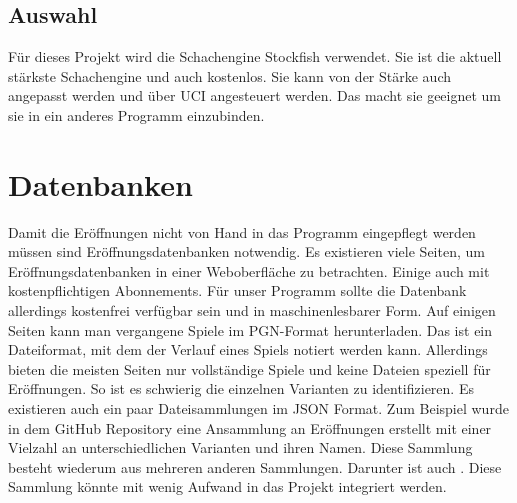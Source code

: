 \subsection{Auswahl}
Für dieses Projekt wird die Schachengine Stockfish verwendet. Sie ist die aktuell stärkste Schachengine und auch kostenlos. Sie kann von der Stärke auch angepasst werden und über \ac{UCI} angesteuert werden. Das macht sie geeignet um sie in ein anderes Programm einzubinden.

\section{Datenbanken}
Damit die Eröffnungen nicht von Hand in das Programm eingepflegt werden müssen sind Eröffnungsdatenbanken notwendig. Es existieren viele Seiten, um Eröffnungsdatenbanken in einer Weboberfläche zu betrachten. Einige auch mit kostenpflichtigen Abonnements. Für unser Programm sollte die Datenbank allerdings kostenfrei verfügbar sein und in maschinenlesbarer Form. Auf einigen Seiten kann man vergangene Spiele im \ac{PGN}-Format herunterladen. Das ist ein Dateiformat, mit dem der Verlauf eines Spiels notiert werden kann. Allerdings bieten die meisten Seiten nur vollständige Spiele und keine Dateien speziell für Eröffnungen. So ist es schwierig die einzelnen Varianten zu identifizieren. Es existieren auch ein paar Dateisammlungen im JSON Format. Zum Beispiel wurde in dem GitHub Repository \cite{omur_yanikoglu_ecojson_2025} eine Ansammlung an Eröffnungen erstellt mit einer Vielzahl an unterschiedlichen Varianten und ihren Namen. Diese Sammlung besteht wiederum aus mehreren anderen Sammlungen. Darunter ist auch \cite{lichessorg_chess-openings_2025}. Diese Sammlung könnte mit wenig Aufwand in das Projekt integriert werden.
